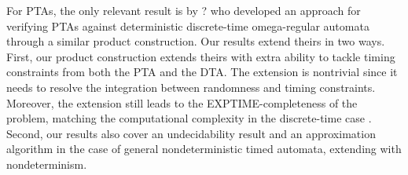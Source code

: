 For PTAs, the only relevant result is by ?\cite{?} who developed an approach for verifying PTAs against deterministic discrete-time omega-regular automata through a similar product construction.
Our results extend theirs in two ways.
First, our product construction extends theirs with extra ability to tackle timing constraints from both the PTA and the DTA.
The extension is nontrivial since it needs to resolve the integration between randomness and timing constraints.
Moreover, the extension still leads to the EXPTIME-completeness of the problem, matching the computational complexity in the discrete-time case \cite{?}.
Second, our results also cover an undecidability result and an approximation algorithm in the case of general nondeterministic timed automata, extending \cite{?} with nondeterminism.
